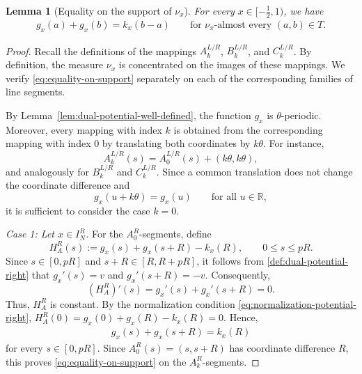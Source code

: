 \documentclass{article}
\newtheorem{lemma}[theorem]{Lemma}
\begin{document}
\begin{lemma}[Equality on the support of \(\nu_x\)]
\label{lem:equality-on-support}
For every \(x\in[-\frac12,1)\), we have
\begin{align}\label{eq:equality-on-support}
    g_x(a)+g_x(b)
    =
    k_x(b-a)
    \qquad
    \text{for }\nu_x\text{-almost every }(a,b)\in T.
\end{align}
\end{lemma}

\begin{proof}
Recall the definitions of the mappings \(A_k^{L/R}\), \(B_k^{L/R}\), and \(C_k^{L/R}\).
By definition, the measure \(\nu_x\) is concentrated on the images of these mappings.
We verify \eqref{eq:equality-on-support} separately on each of the corresponding families of line segments.

By Lemma~\ref{lem:dual-potential-well-defined}, the function \(g_x\) is \(\theta\)-periodic.
Moreover, every mapping with index \(k\) is obtained from the corresponding mapping with index \(0\) by translating both coordinates by \(k\theta\).
For instance,
\[
    A_k^{L/R}(s)
    =
    A_0^{L/R}(s)+(k\theta,k\theta),
\]
and analogously for \(B_k^{L/R}\) and \(C_k^{L/R}\).
Since a common translation does not change the coordinate difference and
\[
    g_x(u+k\theta)=g_x(u)
    \qquad\text{for all }u\in\mathbb R,
\]
it is sufficient to consider the case \(k=0\).

\medskip
\noindent
\emph{Case 1: Let \(x\in I_N^R\).}
For the \(A_0^R\)-segments, define
\[
    H_A^R(s)
    :=
    g_x(s)+g_x(s+R)-k_x(R),
    \qquad
    0\leq s\leq pR.
\]
Since \(s\in[0,pR]\) and \(s+R\in[R,R+pR]\), it follows from \eqref{def:dual-potential-right} that \(g_x'(s)=v\) and \(g_x'(s+R)=-v\).
Consequently,
\[
    (H_A^R)'(s)
    =
    g_x'(s)+g_x'(s+R)
    =
    0.
\]
Thus, \(H_A^R\) is constant.
By the normalization condition \eqref{eq:normalization-potential-right}, \(H_A^R(0) = g_x(0)+g_x(R)-k_x(R) = 0. \) Hence,
\begin{align}\label{eq_H_A00}
    g_x(s)+g_x(s+R)=k_x(R)
\end{align}
for every \(s\in[0,pR]\).
Since \(A_0^R(s)=(s,s+R)\) has coordinate difference \(R\), this proves \eqref{eq:equality-on-support} on the \(A_k^R\)-segments.


\end{proof}
\end{document}
